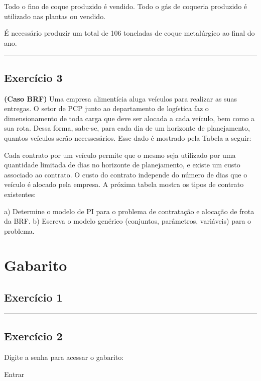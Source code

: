 \documentclass[
]{book}
\begin{document}
Todo o fino de coque produzido é vendido. Todo o gás de coqueria produzido é utilizado nas plantas ou vendido.

É necessário produzir um total de 106 toneladas de coque metalúrgico ao final do ano.

\begin{center}\rule{0.5\linewidth}{0.5pt}\end{center}

\section*{Exercício 3}\label{exercuxedcio-3}

\textbf{(Caso BRF)} Uma empresa alimentícia aluga veículos para realizar as suas entregas. O setor de PCP junto ao departamento de logística faz o dimensionamento de toda carga que deve ser alocada a cada veículo, bem como a sua rota. Dessa forma, sabe-se, para cada dia de um horizonte de planejamento, quantos veículos serão necessesários. Esse dado é mostrado pela Tabela a seguir:

Cada contrato por um veículo permite que o mesmo seja utilizado por uma quantidade limitada de dias no horizonte de planejamento, e existe um custo associado ao contrato. O custo do contrato independe do número de dias que o veículo é alocado pela empresa. A próxima tabela mostra os tipos de contrato existentes:

a) Determine o modelo de PI para o problema de contratação e alocação de frota da BRF.
b) Escreva o modelo genérico (conjuntos, parâmetros, variáveis) para o problema.

\chapter*{Gabarito}\label{gabarito}

\label{conteudo-secreto}
\section*{Exercício 1}\label{exercuxedcio-1-1}

\begin{center}\rule{0.5\linewidth}{0.5pt}\end{center}

\section*{Exercício 2}\label{exercuxedcio-2-1}

\label{senha-div}
Digite a senha para acessar o gabarito:

Entrar

  
\end{document}
